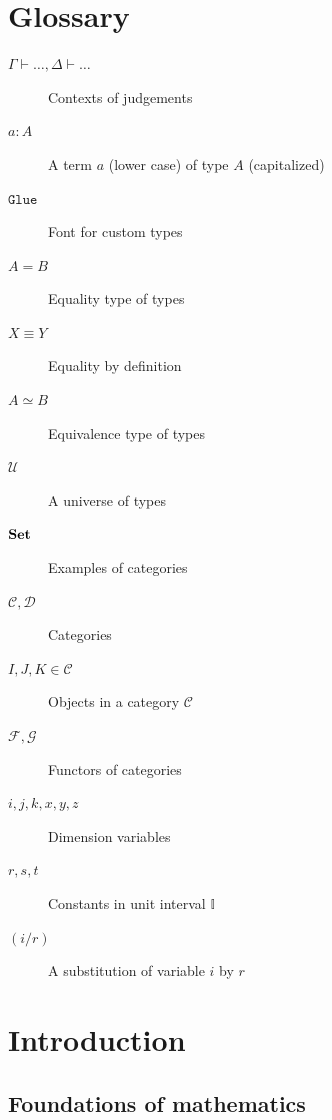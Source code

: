 \documentclass[12pt,a4paper,twoside,xetex]{book} %
\newcommand{\op}[1]{\mathtt{#1}}
\begin{document}
\chapter*{Glossary}


\begin{description}
\item[$\Gamma \vdash \ldots, \Delta \vdash \ldots$] Contexts of judgements
\item[$a : A$] A term $a$ (lower case) of type $A$ (capitalized)
\item[$\op{Glue}$] Font for custom types
\item[$A = B$] Equality type of types
\item[$X \equiv Y$] Equality by definition
\item[$A \simeq B$] Equivalence type of types
\item[$\mathcal{U}$] A universe of types
\item[$\text{\textbf{Set}}$] Examples of categories
\item[$\mathcal{C}, \mathcal{D}$] Categories
\item[$I,J,K \in \mathcal{C}$] Objects in a category $\mathcal{C}$
\item[$\mathcal{F}, \mathcal{G}$] Functors of categories
\item[$i,j,k,x,y,z$] Dimension variables
\item[$r,s,t$] Constants in unit interval $\mathbb{I}$
\item[$(i/r)$] A substitution of variable $i$ by $r$
\end{description}

% 

\tableofcontents


\newpage
\setcounter{page}{0}




\chapter{Introduction}

\section{Foundations of mathematics}\label{types}
\end{document}
